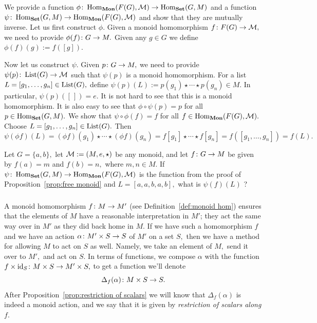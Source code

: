 \documentclass[CT4S-EN-RU]{subfiles}
\begin{document}
\begin{proofENG}
We provide a function $\phi\colon\operatorname{Hom}_{\mathbf{Mon}}(F(G),\mathcal{M})\rightarrow\operatorname{Hom}_{\mathbf{Set}}(G,M)$ and a function $\psi\colon\operatorname{Hom}_{\mathbf{Set}}(G,M)\rightarrow\operatorname{Hom}_{\mathbf{Mon}}(F(G),\mathcal{M})$ and show that they are mutually inverse. Let us first construct $\phi.$ Given a monoid homomorphism $f\colon F(G)\rightarrow\mathcal{M},$ we need to provide $\phi(f)\colon G\rightarrow M.$ Given any $g\in G$ we define $\phi(f)(g):=f([g]).$

Now let us construct $\psi.$ Given $p\colon G\rightarrow M,$ we need to provide $\psi(p)\colon\operatorname{List}(G)\rightarrow\mathcal{M}$ such that $\psi(p)$ is a monoid homomorphism. For a list $L=[g_1,\ldots,g_n]\in\operatorname{List}(G),$ define $\psi(p)(L):=p(g_1)\star\cdots\star p(g_n)\in M.$ In particular, $\psi(p)([\,])=e.$ It is not hard to see that this is a monoid homomorphism. It is also easy to see that $\phi\circ\psi(p)=p$ for all $p\in\operatorname{Hom}_{\mathbf{Set}}(G,M).$ We show that $\psi\circ\phi(f)=f$ for all $f\in\operatorname{Hom}_{\mathbf{Mon}}(F(G),\mathcal{M}).$ Choose $L=[g_1,\ldots,g_n]\in\operatorname{List}(G).$ Then
$$\psi(\phi f)(L)=(\phi f)(g_1)\star\cdots\star(\phi f)(g_n)=f[g_1]\star\cdots\star f[g_n]=f([g_1,\ldots,g_n])=f(L).$$
\end{proofENG}

\begin{proofRUS}
\end{proofRUS}

\begin{exerciseENG}
Let $G=\{a,b\},$ let $\mathcal{M}:=(M,e,\star)$ be any monoid, and let $f\colon G\rightarrow M$ be given by $f(a)=m$ and $f(b)=n,$ where $m,n\in M.$ If $\psi\colon\operatorname{Hom}_{\mathbf{Set}}(G,M)\rightarrow\operatorname{Hom}_{\mathbf{Mon}}(F(G),\mathcal{M})$ is the function from the proof of Proposition~\ref{prop:free monoid} and $L=[a,a,b,a,b],$ what is $\psi(f)(L)$ ?
\end{exerciseENG}

\begin{exerciseRUS}
\end{exerciseRUS}


\subsubsection{}

\begin{blockENG}
A monoid homomorphism $f\colon M\rightarrow M'$ (see Definition~\ref{def:monoid hom}) ensures that the elements of $M$ have a reasonable interpretation in $M'$; they act the same way over in $M'$ as they did back home in $M.$ If we have such a homomorphism $f$ and we have an action $\alpha\colon M'\times S\rightarrow S$ of $M'$ on a set $S,$ then we have a method for allowing $M$ to act on $S$ as well. Namely, we take an element of $M,$ send it over to $M',$ and act on $S.$ In terms of functions, we compose $\alpha$ with the function $f\times\operatorname{id}_S\colon M\times S\rightarrow M'\times S,$ to get a function we'll denote $$\Delta_f(\alpha)\colon M\times S\rightarrow S.$$ After Proposition~\ref{prop:restriction of scalars} we will know that $\Delta_f(\alpha)$ is indeed a monoid action, and we say that it is given by {\em restriction of scalars along $f$}.
\end{blockENG}
\end{document}
